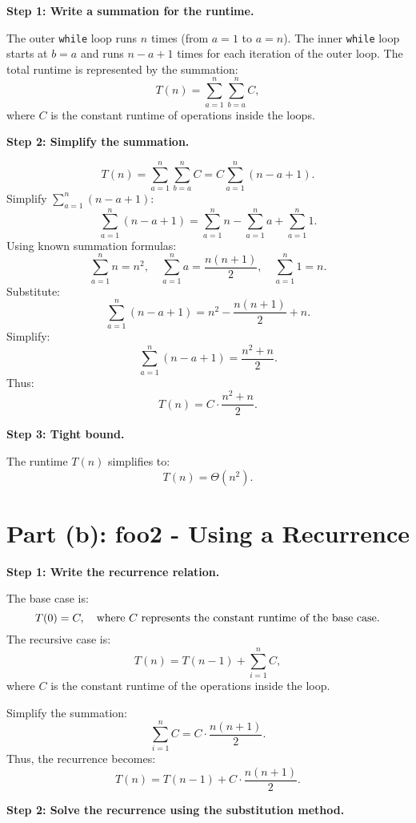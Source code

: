 \documentclass{article}
\begin{document}
\textbf{Step 1: Write a summation for the runtime.}

The outer \texttt{while} loop runs \( n \) times (from \( a = 1 \) to \( a = n \)).  
The inner \texttt{while} loop starts at \( b = a \) and runs \( n - a + 1 \) times for each iteration of the outer loop.  
The total runtime is represented by the summation:
\[
T(n) = \sum_{a=1}^{n} \sum_{b=a}^{n} C,
\]
where \( C \) is the constant runtime of operations inside the loops.

\textbf{Step 2: Simplify the summation.}

\[
T(n) = \sum_{a=1}^{n} \sum_{b=a}^{n} C = C \sum_{a=1}^{n} \left( n - a + 1 \right).
\]
Simplify \( \sum_{a=1}^{n} (n - a + 1) \):
\[
\sum_{a=1}^{n} (n - a + 1) = \sum_{a=1}^{n} n - \sum_{a=1}^{n} a + \sum_{a=1}^{n} 1.
\]
Using known summation formulas:
\[
\sum_{a=1}^{n} n = n^2, \quad \sum_{a=1}^{n} a = \frac{n(n+1)}{2}, \quad \sum_{a=1}^{n} 1 = n.
\]
Substitute:
\[
\sum_{a=1}^{n} (n - a + 1) = n^2 - \frac{n(n+1)}{2} + n.
\]
Simplify:
\[
\sum_{a=1}^{n} (n - a + 1) = \frac{n^2 + n}{2}.
\]
Thus:
\[
T(n) = C \cdot \frac{n^2 + n}{2}.
\]

\textbf{Step 3: Tight bound.}

The runtime \( T(n) \) simplifies to:
\[
T(n) = \Theta(n^2).
\]

\section*{Part (b): foo2 - Using a Recurrence}


\textbf{Step 1: Write the recurrence relation.}

The base case is:
\[
T(0) = C, \quad \text{where \( C \) represents the constant runtime of the base case.}
\]
The recursive case is:
\[
T(n) = T(n-1) + \sum_{i=1}^{n} C,
\]
where \( C \) is the constant runtime of the operations inside the loop.

Simplify the summation:
\[
\sum_{i=1}^{n} C = C \cdot \frac{n(n+1)}{2}.
\]
Thus, the recurrence becomes:
\[
T(n) = T(n-1) + C \cdot \frac{n(n+1)}{2}.
\]

\textbf{Step 2: Solve the recurrence using the substitution method.}
\end{document}

